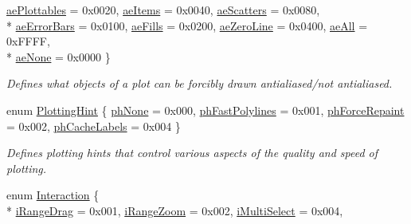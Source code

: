 \begin{DoxyCompactItemize}
\hyperlink{namespaceQCP_ae55dbe315d41fe80f29ba88100843a0ca4145e4251b0cf2dbedabeea0a38f84f6}{ae\+Plottables} = 0x0020, 
\hyperlink{namespaceQCP_ae55dbe315d41fe80f29ba88100843a0caf7712a85d6b0c75b24301d2fe9484db3}{ae\+Items} = 0x0040, 
\hyperlink{namespaceQCP_ae55dbe315d41fe80f29ba88100843a0cae45ed8cd167bffe27d7f40da4bc17e9c}{ae\+Scatters} = 0x0080, 
\\*
\hyperlink{namespaceQCP_ae55dbe315d41fe80f29ba88100843a0ca9dcf3882cb321bb305f71fdc0f09f63d}{ae\+Error\+Bars} = 0x0100, 
\hyperlink{namespaceQCP_ae55dbe315d41fe80f29ba88100843a0ca788810f0aa930137de6ad6cc6d83d354}{ae\+Fills} = 0x0200, 
\hyperlink{namespaceQCP_ae55dbe315d41fe80f29ba88100843a0ca261f8ea78cf3c9561726223ffa33dc12}{ae\+Zero\+Line} = 0x0400, 
\hyperlink{namespaceQCP_ae55dbe315d41fe80f29ba88100843a0caa897c232a0ffc8368e7c100ffc59ef31}{ae\+All} = 0x\+F\+F\+F\+F, 
\\*
\hyperlink{namespaceQCP_ae55dbe315d41fe80f29ba88100843a0caa9e90d81896358757d94275aeaa58f6a}{ae\+None} = 0x0000
 \}\begin{DoxyCompactList}\small\item\em Defines what objects of a plot can be forcibly drawn antialiased/not antialiased. \end{DoxyCompactList}
\item 
enum \hyperlink{namespaceQCP_a5400e5fcb9528d92002ddb938c1f4ef4}{Plotting\+Hint} \{ \hyperlink{namespaceQCP_a5400e5fcb9528d92002ddb938c1f4ef4ab7283c5bfc1ba9e597015389880bda42}{ph\+None} = 0x000, 
\hyperlink{namespaceQCP_a5400e5fcb9528d92002ddb938c1f4ef4aa5fd227bc878c56ad2a87ea32c74ee4d}{ph\+Fast\+Polylines} = 0x001, 
\hyperlink{namespaceQCP_a5400e5fcb9528d92002ddb938c1f4ef4aa3090dafa0e0f9a28c579c79d6c2d283}{ph\+Force\+Repaint} = 0x002, 
\hyperlink{namespaceQCP_a5400e5fcb9528d92002ddb938c1f4ef4a8e9cfe5ee0c5cd36dd7accf9739aff65}{ph\+Cache\+Labels} = 0x004
 \}\begin{DoxyCompactList}\small\item\em Defines plotting hints that control various aspects of the quality and speed of plotting. \end{DoxyCompactList}
\item 
enum \hyperlink{namespaceQCP_a2ad6bb6281c7c2d593d4277b44c2b037}{Interaction} \{ \\*
\hyperlink{namespaceQCP_a2ad6bb6281c7c2d593d4277b44c2b037a2c4432b9aceafb94000be8d1b589ef18}{i\+Range\+Drag} = 0x001, 
\hyperlink{namespaceQCP_a2ad6bb6281c7c2d593d4277b44c2b037abee1e94353525a636aeaf0ba32b72e14}{i\+Range\+Zoom} = 0x002, 
\hyperlink{namespaceQCP_a2ad6bb6281c7c2d593d4277b44c2b037aef673112c5067c3cf4cfddb62da7265d}{i\+Multi\+Select} = 0x004, 

\end{DoxyCompactItemize}
